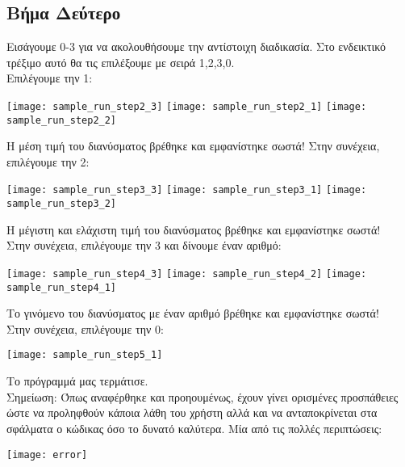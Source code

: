 \subsection{Βήμα Δεύτερο}
Εισάγουμε 0-3 για να ακολουθήσουμε την αντίστοιχη διαδικασία.
Στο ενδεικτικό τρέξιμο αυτό θα τις επιλέξουμε με σειρά 1,2,3,0.
\\
Επιλέγουμε την 1:
\begin{center}
\texttt{[image: sample\_run\_step2\_3]}
\texttt{[image: sample\_run\_step2\_1]}
\texttt{[image: sample\_run\_step2\_2]}
\end{center}
Η μέση τιμή του διανύσματος βρέθηκε και εμφανίστηκε σωστά!
Στην συνέχεια, επιλέγουμε την 2:
\begin{center}
\texttt{[image: sample\_run\_step3\_3]}
\texttt{[image: sample\_run\_step3\_1]}
\texttt{[image: sample\_run\_step3\_2]}
\end{center}
Η μέγιστη και ελάχιστη τιμή του διανύσματος βρέθηκε και εμφανίστηκε σωστά!
\\
Στην συνέχεια, επιλέγουμε την 3 και δίνουμε έναν αριθμό:
\begin{center}
\texttt{[image: sample\_run\_step4\_3]}
\texttt{[image: sample\_run\_step4\_2]}
\texttt{[image: sample\_run\_step4\_1]}
\end{center}
Το γινόμενο του διανύσματος με έναν αριθμό βρέθηκε και εμφανίστηκε σωστά!
\\
Στην συνέχεια, επιλέγουμε την 0:
\begin{center}
\texttt{[image: sample\_run\_step5\_1]}
\end{center}
Το πρόγραμμά μας τερμάτισε.
\\
Σημείωση: Όπως αναφέρθηκε και προηουμένως, έχουν γίνει ορισμένες προσπάθειες
ώστε να προληφθούν κάποια λάθη του χρήστη αλλά και να ανταποκρίνεται στα
σφάλματα ο κώδικας όσο το δυνατό καλύτερα. Μία από τις πολλές περιπτώσεις:
\begin{center}
    \texttt{[image: error]}
\end{center}
